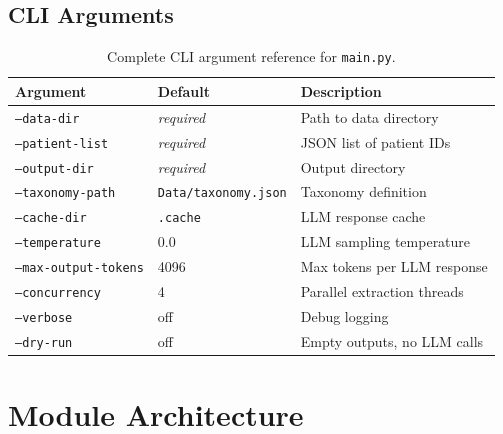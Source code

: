 \documentclass[11pt, a4paper]{article}
\begin{document}
\subsection{CLI Arguments}

\begin{table}[H]
\centering
\caption{Complete CLI argument reference for \texttt{main.py}.}
\begin{tabular}{llp{7.5cm}}
\toprule
\textbf{Argument} & \textbf{Default} & \textbf{Description} \\
\midrule
\texttt{--data-dir} & \emph{required} & Path to data directory \\
\texttt{--patient-list} & \emph{required} & JSON list of patient IDs \\
\texttt{--output-dir} & \emph{required} & Output directory \\
\texttt{--taxonomy-path} & \texttt{Data/taxonomy.json} & Taxonomy definition \\
\texttt{--cache-dir} & \texttt{.cache} & LLM response cache \\
\texttt{--temperature} & 0.0 & LLM sampling temperature \\
\texttt{--max-output-tokens} & 4096 & Max tokens per LLM response \\
\texttt{--concurrency} & 4 & Parallel extraction threads \\
\texttt{--verbose} & off & Debug logging \\
\texttt{--dry-run} & off & Empty outputs, no LLM calls \\
\bottomrule
\end{tabular}
\end{table}

\section{Module Architecture}
\end{document}

